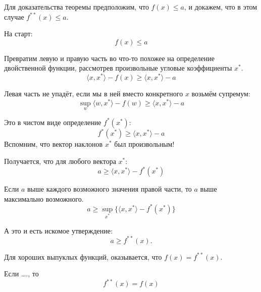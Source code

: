 \documentclass[
  letterpaper,
  DIV=11,
  numbers=noendperiod]{scrartcl}
\begin{document}
\begin{tcolorbox}[enhanced jigsaw, coltitle=black, colback=white, opacitybacktitle=0.6, colframe=quarto-callout-warning-color-frame, titlerule=0mm, leftrule=.75mm, bottomrule=.15mm, opacityback=0, toptitle=1mm, bottomtitle=1mm, arc=.35mm, colbacktitle=quarto-callout-warning-color!10!white, title=\textcolor{quarto-callout-warning-color}{\faExclamationTriangle}\hspace{0.5em}{Доказательство неравенства}, rightrule=.15mm, breakable, toprule=.15mm, left=2mm]

Для доказательства теоремы предположим, что \(f(x) \leq a\), и докажем,
что в этом случае \(f^{**}(x) \leq a\).

На старт: \[
f(x) \leq a
\]

Превратим левую и правую часть во что-то похожее на определение
двойственной функции, рассмотрев произвольные угловые коэффициенты
\(x^*\). \[
\langle x, x^* \rangle - f(x) \geq \langle x, x^* \rangle - a
\]

Левая часть не упадёт, если мы в ней вместо конкретного \(x\) возьмём
супремум: \[
\sup_{w}\langle w, x^* \rangle - f(w) \geq \langle x, x^* \rangle - a
\]

Это в чистом виде определение \(f^*(x^*)\): \[
f^*(x^*) \geq \langle x, x^* \rangle - a
\] Вспомним, что вектор наклонов \(x^*\) был произвольным!

Получается, что для любого вектора \(x^*\): \[
a \geq \langle x, x^* \rangle - f^*(x^*)
\]

Если \(a\) выше каждого возможного значения правой части, то \(a\) выше
максимально возможного. \[
a \geq \sup_{x^*}\{\langle x, x^* \rangle - f^*(x^*)\}
\]

А это и есть искомое утверждение: \[
a \geq f^{**}(x).
\]

\end{tcolorbox}

Для хороших выпуклых функций, оказывается, что \(f(x)=f^{**}(x)\).

\begin{tcolorbox}[enhanced jigsaw, coltitle=black, colback=white, opacitybacktitle=0.6, colframe=quarto-callout-note-color-frame, titlerule=0mm, leftrule=.75mm, bottomrule=.15mm, opacityback=0, toptitle=1mm, bottomtitle=1mm, arc=.35mm, colbacktitle=quarto-callout-note-color!10!white, title=\textcolor{quarto-callout-note-color}{\faInfo}\hspace{0.5em}{Теоремка}, rightrule=.15mm, breakable, toprule=.15mm, left=2mm]

Если \ldots., то \[
f^{**}(x) = f(x)
\]

\end{tcolorbox}
\end{document}
